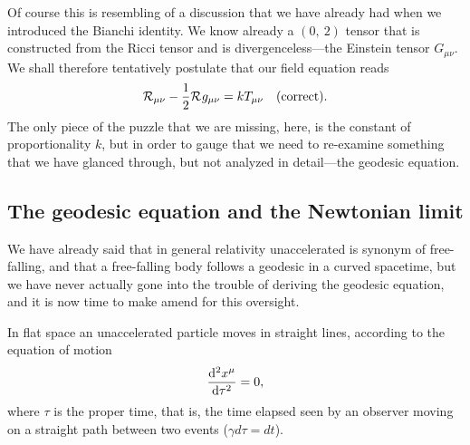 Of course this is resembling of a discussion that we have already had when we introduced
the Bianchi identity. We know already a $(0,~2)$ tensor that is constructed from
the Ricci tensor and is divergenceless---the Einstein tensor $G_{\mu\nu}$. We shall
therefore tentatively postulate that our field equation reads
\begin{align*}
  \mathcal{R}_{\mu\nu} - \frac{1}{2}\mathcal{R}_{}g_{\mu\nu} = kT_{\mu\nu}
  \quad\text{(correct)}.
\end{align*}
The only piece of the puzzle that we are missing, here, is the constant of proportionality
$k$, but in order to gauge that we need to re-examine something that we have glanced
through, but not analyzed in detail---the geodesic equation.



\subsection{The geodesic equation and the Newtonian limit}

We have already said that in general relativity unaccelerated is synonym of free-falling,
and that a free-falling body follows a geodesic in a curved spacetime, but we have
never actually gone into the trouble of deriving the geodesic equation, and it is
now time to make amend for this oversight.

In flat space an unaccelerated particle moves in straight lines, according to the
equation of motion
\begin{align}
   \dv[2]{x^\mu}{\tau} = 0,
\end{align}
where $\tau$ is the proper time, that is, the time elapsed seen by an observer moving on a straight path
between two events ($\gamma d\tau = dt$).

